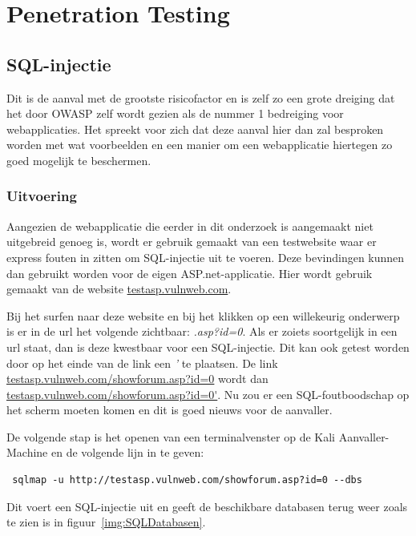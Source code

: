 \documentclass[pdftex,a4paper,12pt]{report}
\begin{document}
\chapter{Penetration Testing}

\section{SQL-injectie}
Dit is de aanval met de grootste risicofactor en is zelf zo een grote dreiging dat het door OWASP zelf wordt gezien als de nummer 1 bedreiging voor webapplicaties. Het spreekt voor zich dat deze aanval hier dan zal besproken worden met wat voorbeelden en een manier om een webapplicatie hiertegen zo goed mogelijk te beschermen.

\subsection{Uitvoering}
Aangezien de webapplicatie die eerder in dit onderzoek is aangemaakt niet uitgebreid genoeg is, wordt er gebruik gemaakt van een testwebsite waar er express fouten in zitten om SQL-injectie uit te voeren. Deze bevindingen kunnen dan gebruikt worden voor de eigen ASP.net-applicatie. Hier wordt gebruik gemaakt van de website \url{testasp.vulnweb.com}. \newline

Bij het surfen naar deze website en bij het klikken op een willekeurig onderwerp is er in de url het volgende zichtbaar: \textit{.asp?id=0}. Als er zoiets soortgelijk in een url staat, dan is deze kwestbaar voor een SQL-injectie. Dit kan ook getest worden door op het einde van de link een \textit{'} te plaatsen. De link \url{testasp.vulnweb.com/showforum.asp?id=0} wordt dan \url{testasp.vulnweb.com/showforum.asp?id=0'}. Nu zou er een SQL-foutboodschap op het scherm moeten komen en dit is goed nieuws voor de aanvaller. \newline

De volgende stap is het openen van een terminalvenster op de Kali Aanvaller-Machine en de volgende lijn in te geven:
\begin{verbatim} sqlmap -u http://testasp.vulnweb.com/showforum.asp?id=0 --dbs \end{verbatim}
Dit voert een SQL-injectie uit en geeft de beschikbare databasen terug weer zoals te zien is in figuur~\ref{img:SQLDatabasen}. 
\end{document}
